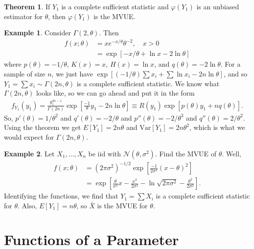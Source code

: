 \documentclass{book}
\theoremstyle{definition}
\newtheorem{thm}{Theorem}[section]
\newtheorem{exmp}{Example}[section]
\newcommand{\nn}{\nonumber}
\newcommand{\Var}{\text{Var}}
\newcommand{\N}{\mathcal{N}}
\newcommand{\f}[2]{\frac{#1}{#2}}
\newcommand{\lb}{\left[}
\newcommand{\rb}{\right]}
\begin{document}
\begin{thm}
	If $Y_1$ is a complete sufficient statistic and $\varphi(Y_1)$ is an unbiased estimator for $\theta$, then $\varphi(Y_1)$ is the MVUE. 
\end{thm}


\begin{exmp}
	Consider $\Gamma(2,\theta)$. Then 
	\begin{align}
	f(x;\theta) &= xe^{-x/\theta}\theta^{-2}, \quad x>0\nn\\
	&=\exp\lb -x/\theta + \ln x -2\ln \theta\rb
	\end{align}
	where $p(\theta) = -1/\theta$, $K(x) = x$, $H(x) = \ln x$, and $q(\theta) = -2\ln \theta$. For a sample of size $n$, we just have $\exp\lb (-1/\theta)\sum x_i + \sum \ln x_i -2n\ln\theta \rb$, and so $Y_1 = \sum x_i \sim \Gamma(2n,\theta)$ is a complete sufficient statistic. 	We know what $\Gamma(2n,\theta)$ looks like, so we can go ahead and put it in the form
	\begin{align}
	f_{Y_1}(y_1) = \f{y_1^{2n-1}}{\Gamma(2n)}\exp\lb \f{-1}{\theta}y_1 - 2n\ln\theta \rb \equiv R(y_1)\exp\lb p(\theta)y_1 + n q(\theta) \rb.
	\end{align}
	So, 
	$p'(\theta) = 1/\theta^2$ and $q'(\theta) = -2/\theta$ and $p''(\theta)  =-2/\theta^3$ and $q''(\theta) = 2/\theta^2$. Using the theorem we get $E[Y_1] = 2n\theta$ and $\Var[Y_1] = 2n\theta^2$, which is what we would expect for $\Gamma(2n,\theta)$. 
\end{exmp}


\begin{exmp}
	Let $X_1,\dots,X_n$ be iid with $\N(\theta,\sigma^2)$. Find the MVUE of $\theta$. Well, 
	\begin{align}
	f(x;\theta) &= (2\pi \sigma^2)^{-1/2}\exp\lb \f{-1}{2\sigma^2}(x-\theta)^2 \rb \nn\\
	&= \exp\lb \f{\theta}{\sigma^2}x - \f{x^2}{2\sigma^2} - \ln \sqrt{2\pi \sigma^2} - \f{\theta^2}{2\sigma^2} \rb.
	\end{align}
	Identifying the functions, we find that $Y_1 = \sum X_i$ is a complete sufficient statistic for $\theta$. Also, $E[Y_1] = n\theta$, so $\bar{X}$ is the MVUE for $\theta$. 
\end{exmp}


\section{Functions of a Parameter}
\end{document}
